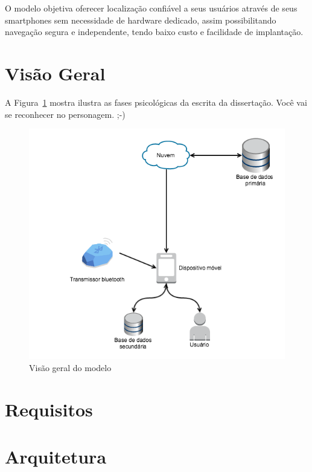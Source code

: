 \documentclass[english,brazilian]{UNISINOSmonografia}
\begin{document}
O modelo objetiva oferecer localização confiável a seus usuários através de seus smartphones sem necessidade de hardware dedicado, assim possibilitando navegação segura e independente, tendo baixo custo e facilidade de implantação.

	\section{Visão Geral}

A Figura~\ref{fig:blablabla} mostra ilustra as fases psicológicas da escrita da dissertação. Você vai se reconhecer no personagem. ;-)

\FloatBarrier
\begin{figure}[!ht]
	\caption{Visão geral do modelo}
	\label{fig:blablabla}
	\centering%
	\begin{minipage}{.8\textwidth}
		\includegraphics[width=\textwidth]{escrita}
	\end{minipage}
\end{figure}
\FloatBarrier

	\section{Requisitos}

	\section{Arquitetura}
 
\end{document}
